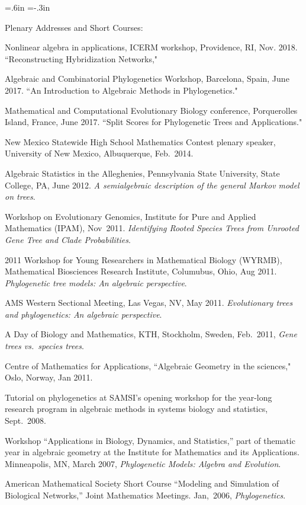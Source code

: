\documentclass[10pt]{report}
\begin{document}
{ \leftskip=.6in \parindent=-.3in  \parskip=3pt

{\sc Plenary Addresses and Short Courses:}

\smallskip

Nonlinear algebra in applications, ICERM workshop, Providence, RI,
Nov. 2018. ``Reconstructing Hybridization Networks,"

Algebraic and Combinatorial Phylogenetics Workshop, Barcelona, Spain,
June 2017.  ``An Introduction to Algebraic Methods in Phylogenetics."

Mathematical and Computational Evolutionary Biology conference,
Porquerolles Island, 
France, June 2017.  ``Split Scores for Phylogenetic Trees and Applications."

New Mexico Statewide High School Mathematics Contest plenary speaker, University
of New Mexico, Albuquerque, Feb.~2014. 

Algebraic Statistics in the Alleghenies, Pennsylvania State University, State
College, PA, June 2012.
\emph{A semialgebraic description of the general Markov model on trees}.

Workshop on Evolutionary Genomics, Institute for Pure and Applied Mathematics
(IPAM), Nov~2011. 
\emph{Identifying Rooted Species Trees from Unrooted Gene Tree and Clade Probabilities}.

2011 Workshop for Young Researchers in Mathematical Biology (WYRMB),
Mathematical Biosciences Research Institute, Columubus, Ohio, Aug 2011.
\emph{Phylogenetic tree models: An algebraic perspective}.

AMS Western Sectional Meeting, Las Vegas, NV, May 2011.
\emph{Evolutionary trees and phylogenetics: An algebraic perspective}.

A Day of Biology and Mathematics, KTH, Stockholm, Sweden, Feb.~2011,
\emph{Gene trees vs.~species trees}.

Centre of Mathematics for Applications, 
``Algebraic Geometry in the sciences,"
Oslo, Norway, Jan 2011.

Tutorial on phylogenetics at SAMSI's opening workshop for the
year-long research program in
algebraic methods in systems biology and statistics, Sept.~2008.

Workshop ``Applications in Biology, Dynamics, and Statistics,'' part
of thematic year in algebraic geometry at the Institute for
Mathematics and its Applications. Minneapolis, MN, March 2007,
\emph{Phylogenetic Models: Algebra and Evolution}.

American Mathematical Society Short Course ``Modeling and Simulation
of Biological Networks,'' Joint Mathematics Meetings. Jan,~2006,
\emph{Phylogenetics}.

}
\end{document}
